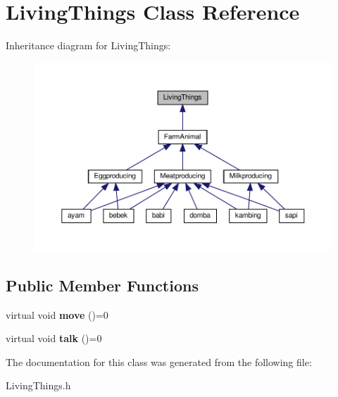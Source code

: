 \hypertarget{classLivingThings}{}\section{Living\+Things Class Reference}
\label{classLivingThings}


Inheritance diagram for Living\+Things\+:
\nopagebreak
\begin{figure}[H]
\begin{center}
\leavevmode
\includegraphics[width=350pt]{classLivingThings__inherit__graph}
\end{center}
\end{figure}
\subsection*{Public Member Functions}
\begin{DoxyCompactItemize}
\item 
\mbox{\label{classLivingThings_a96c7c74745ded9433b6966273aa03d94}} 
virtual void {\bfseries move} ()=0
\item 
\mbox{\label{classLivingThings_a2277af0cf3a294a7e17f2a6e01ba0d84}} 
virtual void {\bfseries talk} ()=0
\end{DoxyCompactItemize}


The documentation for this class was generated from the following file\+:\begin{DoxyCompactItemize}
\item 
Living\+Things.\+h\end{DoxyCompactItemize}
